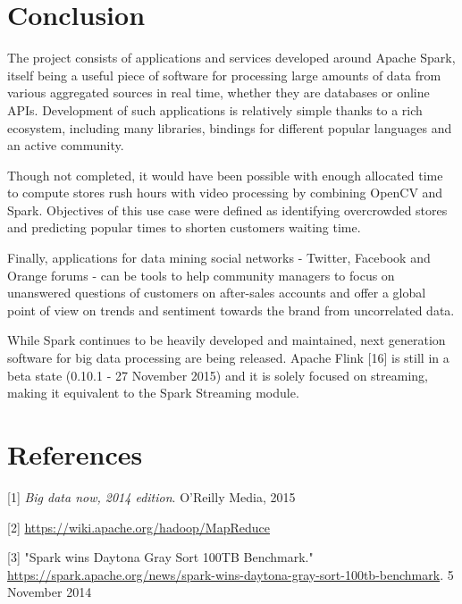 \documentclass[11pt]{article}
\begin{document}
\section{Conclusion}

The project consists of applications and services developed around \textsf{Apache Spark}, itself being a useful piece of software for processing large amounts of data from various aggregated sources in real time, whether they are databases or online APIs. Development of such applications is relatively simple thanks to a rich ecosystem, including many libraries, bindings for different popular languages and an active community.

Though not completed, it would have been possible with enough allocated time to compute stores rush hours with video processing by combining \textsf{OpenCV} and \textsf{Spark}. Objectives of this use case were defined as identifying overcrowded stores and predicting popular times to shorten customers waiting time.
\vspace{4pt}

Finally, applications for data mining social networks - \textsf{Twitter}, \textsf{Facebook} and \textsf{Orange} forums - can be tools to help community managers to focus on unanswered questions of customers on after-sales accounts and offer a global point of view on trends and sentiment towards the brand from uncorrelated data.
\vspace{4pt}

While \textsf{Spark} continues to be heavily developed and maintained, next generation software for big data processing are being released. \textsf{Apache Flink} [16] is still in a beta state (0.10.1 - 27 November 2015) and it is solely focused on streaming, making it equivalent to the \textsf{Spark Streaming} module.

\section{References}



[1] \textit{Big data now, 2014 edition}. O'Reilly Media, 2015
\vspace{1pt}

[2] \url{https://wiki.apache.org/hadoop/MapReduce}
\vspace{1pt}

[3] "Spark wins Daytona Gray Sort 100TB Benchmark." \url{https://spark.apache.org/news/spark-wins-daytona-gray-sort-100tb-benchmark}. 5 November 2014
\vspace{1pt}
\end{document}
